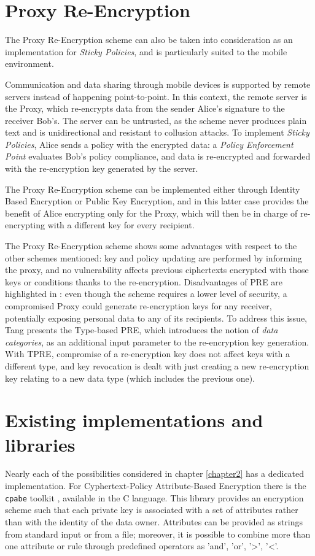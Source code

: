 \section{Proxy Re-Encryption}
The Proxy Re-Encryption scheme \cite{green2007identity} can also be taken into consideration as an implementation for \textit{Sticky Policies}, and is particularly suited to the mobile environment.

Communication and data sharing through mobile devices is supported by remote servers instead of happening point-to-point. In this context, the remote server is the Proxy, which re-encrypts data from the sender Alice's signature to the receiver Bob's. The server can be untrusted, as the scheme never produces plain text and is unidirectional and resistant to collusion attacks. To implement \textit{Sticky Policies}, Alice sends a policy with the encrypted data: a \textit{Policy Enforcement Point} evaluates Bob's policy compliance, and data is re-encrypted and forwarded with the re-encryption key generated by the server.

The Proxy Re-Encryption scheme can be implemented either through Identity Based Encryption or Public Key Encryption, and in this latter case provides the benefit of Alice encrypting only for the Proxy, which will then be in charge of re-encrypting with a different key for every recipient.

The Proxy Re-Encryption scheme shows some advantages with respect to the other schemes mentioned: key and policy updating are performed by informing the proxy, and no vulnerability affects previous ciphertexts encrypted with those keys or conditions thanks to the re-encryption. Disadvantages of PRE are highlighted in \cite{tang2008using}: even though the scheme requires a lower level of security, a compromised Proxy could generate re-encryption keys for any receiver, potentially exposing personal data to any of its recipients. To address this issue, Tang presents the Type-based PRE, which introduces the notion of \textit{data categories}, as an additional input parameter to the re-encryption key generation. With TPRE, compromise of a re-encryption key does not affect keys with a different type, and key revocation is dealt with just creating a new re-encryption key relating to a new data type (which includes the previous one).

\section{Existing implementations and libraries}
Nearly each of the possibilities considered in chapter \ref{chapter2} has a dedicated implementation. For Cyphertext-Policy Attribute-Based Encryption there is the \texttt{cpabe} toolkit \cite{bethencourt2011library}, available in the C language. This library provides an encryption scheme such that each private key is associated with a set of attributes rather than with the identity of the data owner. Attributes can be provided as strings from standard input or from a file; moreover, it is possible to combine more than one attribute or rule through predefined operators as 'and', 'or', '>', '<'.

